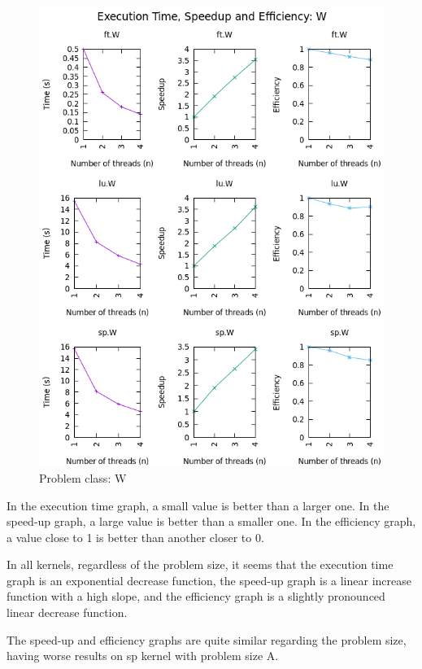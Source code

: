 \documentclass[12pt]{article}
\begin{document}
\begin{figure}[h!]
	\centering
	\includegraphics[width=0.9\linewidth]{W.PTSE.png}
	\caption{Problem class: W}
	\label{fig:w}
\end{figure}

\newpage

In the execution time graph, a small value is better than a larger one. In the speed-up graph, a large value is better than a smaller one. In the efficiency graph, a value close to 1 is better than another closer to 0.

In all kernels, regardless of the problem size, it seems that the execution time graph is an exponential decrease function, the speed-up graph is a linear increase function with a high slope, and the efficiency graph is a slightly pronounced linear decrease function.

The speed-up and efficiency graphs are quite similar regarding the problem size, having worse results on sp kernel with problem size A.
\end{document}
